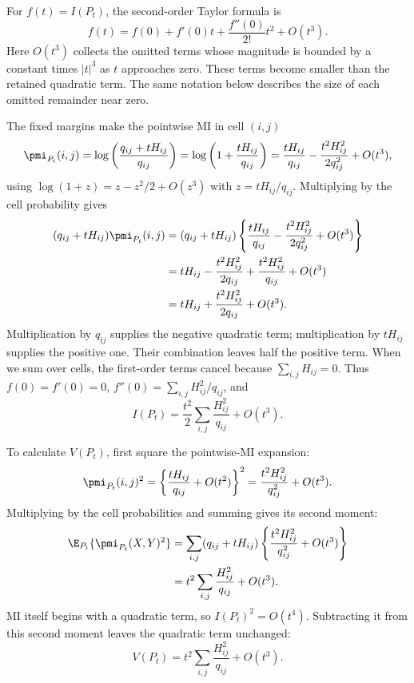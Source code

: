 For \(f(t)=I(P_t)\), the second-order Taylor formula is
\begin{equation}
 f(t)=f(0)+f'(0)t+\frac{f''(0)}{2!}t^2+O(t^3).
\end{equation}
Here \(O(t^3)\) collects the omitted terms whose magnitude is bounded by
a constant times \(|t|^3\) as \(t\) approaches zero. These terms become
smaller than the retained quadratic term. The same notation below describes
the size of each omitted remainder near zero.

The fixed margins make the pointwise MI in cell \((i,j)\)
\begin{equation}
 \pmi_{P_t}(i,j)
 =\log\left(\frac{q_{ij}+tH_{ij}}{q_{ij}}\right)
 =\log\left(1+\frac{tH_{ij}}{q_{ij}}\right)
 =\frac{tH_{ij}}{q_{ij}}-
  \frac{t^2H_{ij}^2}{2q_{ij}^2}+O(t^3),
\end{equation}
using \(\log(1+z)=z-z^2/2+O(z^3)\) with
\(z=tH_{ij}/q_{ij}\). Multiplying by the cell probability gives
\begin{align*}
 (q_{ij}+tH_{ij})\pmi_{P_t}(i,j)
 &=(q_{ij}+tH_{ij})
   \left\{\frac{tH_{ij}}{q_{ij}}
    -\frac{t^2H_{ij}^2}{2q_{ij}^2}+O(t^3)\right\}\\*
 &=tH_{ij}-\frac{t^2H_{ij}^2}{2q_{ij}}
   +\frac{t^2H_{ij}^2}{q_{ij}}+O(t^3)\\*
 &=tH_{ij}+\frac{t^2H_{ij}^2}{2q_{ij}}+O(t^3).
\end{align*}
Multiplication by \(q_{ij}\) supplies the negative quadratic term;
multiplication by \(tH_{ij}\) supplies the positive one. Their combination
leaves half the positive term. When we sum over cells, the first-order
terms cancel because \(\sum_{i,j}H_{ij}=0\).
Thus \(f(0)=f'(0)=0\), \(f''(0)=\sum_{i,j}H_{ij}^2/q_{ij}\), and
\begin{equation}
 I(P_t)=\frac{t^2}{2}\sum_{i,j}\frac{H_{ij}^2}{q_{ij}}+O(t^3).
\end{equation}

To calculate \(V(P_t)\), first square the pointwise-MI expansion:
\begin{equation*}
 \pmi_{P_t}(i,j)^2
 =\left\{\frac{tH_{ij}}{q_{ij}}+O(t^2)\right\}^2
 =\frac{t^2H_{ij}^2}{q_{ij}^2}+O(t^3).
\end{equation*}
Multiplying by the cell probabilities and summing gives its second moment:
\begin{align*}
 \E_{P_t}\{\pmi_{P_t}(X,Y)^2\}
 &=\sum_{i,j}(q_{ij}+tH_{ij})
    \left\{\frac{t^2H_{ij}^2}{q_{ij}^2}+O(t^3)\right\}\\*
 &=t^2\sum_{i,j}\frac{H_{ij}^2}{q_{ij}}+O(t^3).
\end{align*}
MI itself begins with a quadratic term, so \(I(P_t)^2=O(t^4)\).
Subtracting it from this second moment leaves the quadratic term unchanged:
\begin{equation}
 V(P_t)=t^2\sum_{i,j}\frac{H_{ij}^2}{q_{ij}}+O(t^3).
\end{equation}

